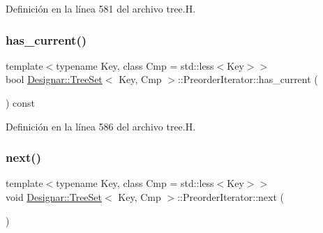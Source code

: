 Definición en la línea 581 del archivo tree.\+H.

\mbox{\label{class_designar_1_1_tree_set_1_1_preorder_iterator_a24d3c99c070468afe487e41fb17fec2d}} 
\subsubsection{\texorpdfstring{has\+\_\+current()}{has\_current()}}
{\footnotesize\ttfamily template$<$typename Key, class Cmp = std\+::less$<$\+Key$>$$>$ \\
bool \hyperlink{class_designar_1_1_tree_set}{Designar\+::\+Tree\+Set}$<$ Key, Cmp $>$\+::Preorder\+Iterator\+::has\+\_\+current (\begin{DoxyParamCaption}{ }\end{DoxyParamCaption}) const\hspace{0.3cm}{\ttfamily [inline]}}



Definición en la línea 586 del archivo tree.\+H.

\mbox{\label{class_designar_1_1_tree_set_1_1_preorder_iterator_a8d9d382d80687846dc21f9b5445d59c7}} 
\subsubsection{\texorpdfstring{next()}{next()}}
{\footnotesize\ttfamily template$<$typename Key, class Cmp = std\+::less$<$\+Key$>$$>$ \\
void \hyperlink{class_designar_1_1_tree_set}{Designar\+::\+Tree\+Set}$<$ Key, Cmp $>$\+::Preorder\+Iterator\+::next (\begin{DoxyParamCaption}{ }\end{DoxyParamCaption})\hspace{0.3cm}{\ttfamily [inline]}}



